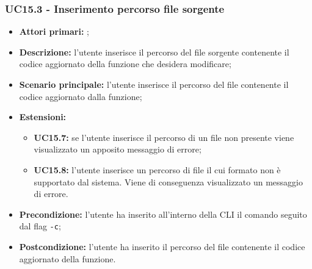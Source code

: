 \subsubsection{UC15.3 - Inserimento percorso file sorgente}
\begin{itemize}
	\item \textbf{Attori primari:} \us{};
	\item \textbf{Descrizione:} l'utente inserisce il percorso del file sorgente contenente il codice aggiornato della funzione che desidera modificare;
	\item \textbf{Scenario principale:} l'utente inserisce il percorso del file contenente il codice aggiornato dalla funzione; 
	\item \textbf{Estensioni:} 
	\begin{itemize}
		\item \textbf{UC15.7:} se l'utente inserisce il percorso di un file non presente viene visualizzato un apposito messaggio di errore;
		\item \textbf{UC15.8:} l’utente inserisce un percorso di file il cui formato non è supportato dal sistema. Viene di conseguenza visualizzato un messaggio di errore.
	\end{itemize}
	\item \textbf{Precondizione:} l’utente ha inserito all’interno della CLI il comando \edit{} seguito dal flag \texttt{-c}; 
	\item \textbf{Postcondizione:} l’utente ha inserito il percorso del file contenente il codice aggiornato della funzione.
\end{itemize}